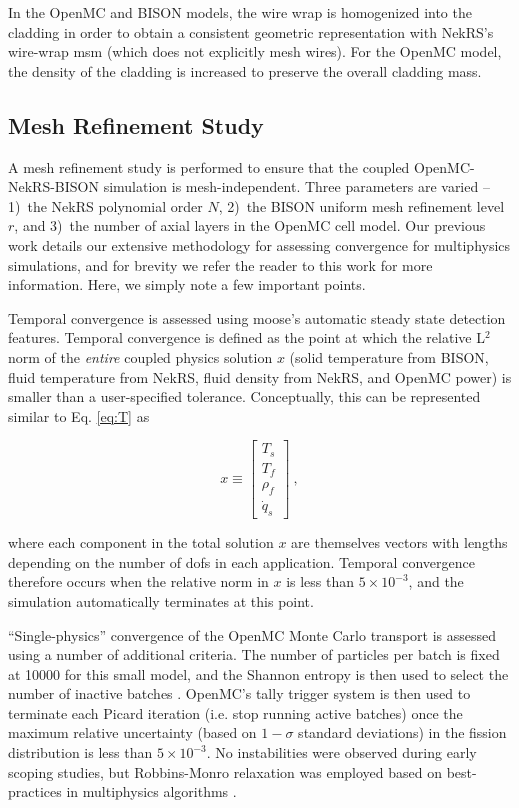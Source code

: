 \documentclass[3p,,preprint,11pt]{elsarticle}
\begin{document}
In the OpenMC and BISON models, the wire wrap is homogenized into the cladding in order to obtain a consistent geometric representation with NekRS's wire-wrap \gls{msm} (which does not explicitly mesh wires). For the OpenMC model, the density of the cladding is increased to preserve the overall cladding mass. %

\subsection{Mesh Refinement Study}
\label{sec:abr_mr}

A mesh refinement study is performed to ensure that the coupled OpenMC-NekRS-BISON simulation is mesh-independent. Three parameters are varied -- 1)~the NekRS polynomial order $N$, 2)~the BISON uniform mesh refinement level $r$, and 3)~the number of axial layers in the OpenMC cell model. Our previous work \cite{novak2022_cardinal} details our extensive methodology for assessing convergence for multiphysics simulations, and for brevity we refer the reader to this work for more information. Here, we simply note a few important points.

Temporal convergence is assessed using \gls{moose}'s automatic steady state detection features. Temporal convergence is defined as the point at which the relative L$^2$ norm of the {\it entire} coupled physics solution $x$ (solid temperature from BISON, fluid temperature from NekRS, fluid density from NekRS, and OpenMC power) is smaller than a user-specified tolerance. Conceptually, this can be represented similar to Eq. \eqref{eq:T} as

\begin{equation}
\label{eq:x}
x\equiv\begin{bmatrix}
T_s\\
T_f\\
\rho_f\\
\dot{q}_s
\end{bmatrix}\ ,
\end{equation}

where each component in the total solution $x$ are themselves vectors with lengths depending on the number of \glspl{dof} in each application. Temporal convergence therefore occurs when the relative norm in $x$ is less than $5\times10^{-3}$, and the simulation automatically terminates at this point.

``Single-physics'' convergence of the OpenMC Monte Carlo transport is assessed using a number of additional criteria. The number of particles per batch is fixed at 10000 for this small model, and the Shannon entropy is then used to select the number of inactive batches \cite{brown_2006}. OpenMC's tally trigger system is then used to terminate each Picard iteration (i.e. stop running active batches) once the maximum relative uncertainty (based on $1-\sigma$ standard deviations) in the fission distribution is less than $5\times10^{-3}$. 
No instabilities were observed during early scoping studies, but Robbins-Monro relaxation \cite{dufek} was employed based on best-practices in multiphysics algorithms \cite{remley}.
\end{document}
